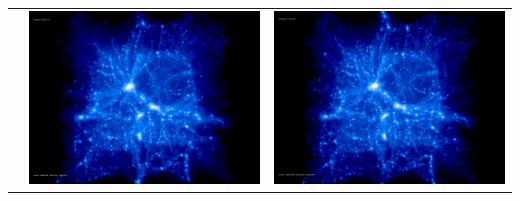 \documentclass[a4paper,11pt,fleqn,oneside]{book}
\begin{document}
\begin{itemize}
\begin{table}[p]
\begin{tabular}{l|c|c}
 & \includegraphics[scale=0.075]{r256/h70/red_st14_log1/197.jpg} & \includegraphics[scale=0.075]{r256/h100/red_st14_log1/197.jpg} \\

\end{tabular}
\end{table}
\end{itemize}
\end{document}
